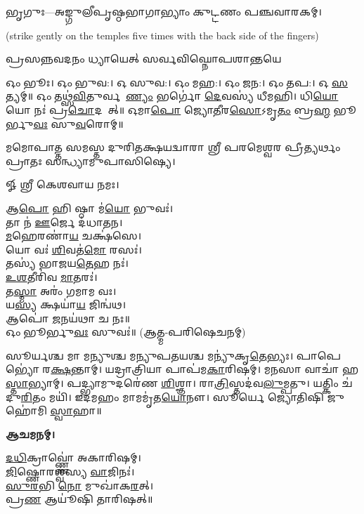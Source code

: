 
𑌭𑍃𑌗𑍁𑌃—𑌅𑌙𑍍𑌗𑍁𑌲𑍀𑌪𑍃𑌷𑍍𑌠𑌭𑌾𑌗𑌾𑌭𑍍𑌯𑌾𑌂 𑌕𑍁𑌟𑍍𑌟𑌣𑌂 𑌪𑌞𑍍𑌚𑌵𑌾𑌰𑌕𑌮𑍍।

{\scriptsize (strike gently on the temples five times with the back side of the fingers)}

{𑌪𑍍𑌰𑌸𑌨𑍍𑌨𑌵𑌦𑌨𑌂 𑌧𑍍𑌯𑌾𑌯𑍇𑌤𑍍 𑌸𑌰𑍍𑌵𑌵𑌿𑌘𑍍𑌨𑍋𑌪𑌶𑌾𑌨𑍍𑌤𑌯𑍇}


𑌓𑌂 𑌭𑍂𑌃। 𑌓𑌂 𑌭𑍁𑌵:। 𑌓 𑌸𑍁𑌵:। 𑌓𑌂 𑌮𑌹:। 𑌓𑌂 𑌜𑌨:। 𑌓𑌂 𑌤𑌪:। 𑌓 \ul{𑌸}𑌤𑍍𑌯𑌮𑍍॥
𑌓𑌂 𑌤𑌥𑍍𑌸॑\ul{𑌵𑌿}𑌤𑍁𑌰𑍍𑌵𑌰𑍇᳚\ul{𑌣𑍍𑌯𑌂} 𑌭𑌰𑍍𑌗𑍋॑ \ul{𑌦𑍇}𑌵𑌸𑍍𑌯॑ 𑌧𑍀𑌮𑌹𑌿। 𑌧𑌿\ul{𑌯𑍋} 𑌯𑍋 𑌨𑌃॑ 𑌪𑍍𑌰\ul{𑌚𑍋}𑌦𑌯𑌾᳚𑌤𑍍॥
𑌓𑌮𑌾\ul{𑌪𑍋} 𑌜𑍍𑌯𑍋\ul{𑌤𑍀}𑌰\ul{𑌸𑍋}𑌽𑌮𑍃\ul{𑌤𑌂} 𑌬𑍍𑌰\ul{𑌹𑍍𑌮} 𑌭𑍂𑌰𑍍𑌭𑍁\ul{𑌵𑌃} 𑌸𑍁\ul{𑌵}𑌰𑍋𑌮𑍍॥


𑌮𑌮𑍋𑌪𑌾𑌤𑍍𑌤 𑌸𑌮𑌸𑍍𑌤 𑌦𑍁𑌰𑌿𑌤𑌕𑍍𑌷𑌯𑌦𑍍𑌵𑌾𑌰𑌾 𑌶𑍍𑌰𑍀 𑌪𑌰𑌮𑍇𑌶𑍍𑌵𑌰 𑌪𑍍𑌰𑍀𑌤𑍍𑌯𑌰𑍍𑌥𑌂 𑌪𑍍𑌰𑌾𑌤𑌃 𑌸𑌨𑍍𑌧𑍍𑌯𑌾𑌮𑍁𑌪𑌾𑌸𑌿𑌷𑍍𑌯𑍇।


𑍐 𑌶𑍍𑌰𑍀 𑌕𑍇𑌶𑌵𑌾𑌯 𑌨𑌮𑌃।

𑌆\ul{𑌪𑍋} 𑌹𑌿 𑌷𑍍𑌠𑌾 𑌮॑\ul{𑌯𑍋} 𑌭𑍁𑌵𑌃॑।\\
𑌤𑌾 𑌨॑ \ul{𑌊}𑌰𑍍𑌜𑍇 𑌦॑𑌧𑌾𑌤𑌨।\\
\ul{𑌮}𑌹𑍇𑌰𑌣𑌾॑\ul{𑌯} 𑌚𑌕𑍍𑌷॑𑌸𑍇।\\
𑌯𑍋 𑌵𑌃॑ \ul{𑌶𑌿}𑌵𑌤॑\ul{𑌮𑍋} 𑌰𑌸𑌃॑।\\
𑌤𑌸𑍍𑌯॑ 𑌭𑌾𑌜𑌯\ul{𑌤𑍇}𑌹 𑌨𑌃॑।\\
\ul{𑌉}\ul{𑌶}𑌤𑍀𑌰𑌿॑𑌵 \ul{𑌮𑌾}𑌤𑌰𑌃॑।\\
𑌤\ul{𑌸𑍍𑌮𑌾} 𑌅𑌰𑌂॑ 𑌗𑌮𑌾𑌮 𑌵𑌃।\\
𑌯\ul{𑌸𑍍𑌯} 𑌕𑍍𑌷𑌯𑌾॑\ul{𑌯} 𑌜𑌿𑌨𑍍𑌵॑𑌥।\\
𑌆𑌪𑍋॑ \ul{𑌜}𑌨𑌯॑𑌥𑌾 𑌚 𑌨𑌃॥\\

𑌓𑌂 𑌭𑍂𑌰𑍍𑌭𑍁\ul{𑌵𑌃} 𑌸𑍁𑌵𑌃॑॥ (𑌆𑌤𑍍𑌮-𑌪𑌰𑌿𑌷𑍇𑌚𑌨𑌮𑍍)



𑌸𑍂𑌰𑍍𑌯𑌶𑍍𑌚 𑌮𑌾 𑌮𑌨𑍍𑌯𑍁𑌶𑍍𑌚 𑌮𑌨𑍍𑌯𑍁𑌪𑌤𑌯𑌶𑍍𑌚 𑌮𑌨𑍍𑌯𑍁॑𑌕𑍃\ul{𑌤𑍇}𑌭𑍍𑌯𑌃। 𑌪𑌾𑌪𑍇𑌭𑍍𑌯𑍋॑ 𑌰\ul{𑌕𑍍𑌷}𑌨𑍍𑌤𑌾𑌮𑍍। 𑌯𑌦𑍍𑌰𑌾𑌤𑍍𑌰𑌿𑌯𑌾 𑌪𑌾𑌪॑𑌮\ul{𑌕𑌾}𑌰𑌿𑌷𑌮𑍍। 𑌮𑌨𑌸𑌾 𑌵𑌾𑌚𑌾॑ 𑌹\ul{𑌸𑍍𑌤𑌾}𑌭𑍍𑌯𑌾𑌮𑍍। 𑌪𑌦𑍍𑌭𑍍𑌯𑌾𑌮𑍁𑌦𑌰𑍇॑𑌣 \ul{𑌶𑌿}𑌶𑍍𑌞𑌾। 𑌰𑌾\ul{𑌤𑍍𑌰𑌿}𑌸𑍍𑌤𑌦॑𑌵\ul{𑌲𑍁}𑌮𑍍𑌪𑌤𑍁। 𑌯𑌤𑍍𑌕𑌿𑌂 𑌚॑ 𑌦𑍁\ul{𑌰𑌿}𑌤𑌂 𑌮𑌯𑌿॑। 𑌇𑌦𑌮𑌹𑌂 𑌮𑌾𑌮𑌮𑍃॑𑌤\ul{𑌯𑍋}𑌨𑍗। 𑌸𑍂𑌰𑍍𑌯𑍇 𑌜𑍍𑌯𑍋𑌤𑌿𑌷𑌿 𑌜𑍁𑌹𑍋॑𑌮𑌿 \ul{𑌸𑍍𑌵𑌾}𑌹𑌾॥


\textbf{𑌆𑌚𑌮𑌨𑌮𑍍।}

\ul{𑌦}\ul{𑌧𑌿}𑌕𑍍𑌰𑌾𑌵𑍍𑌣𑍍𑌣𑍋॑ 𑌅𑌕𑌾𑌰𑌿𑌷𑌮𑍍।\\
 \ul{𑌜𑌿}𑌷𑍍𑌣𑍋𑌰𑌶𑍍𑌵॑𑌸𑍍𑌯 \ul{𑌵𑌾}𑌜𑌿𑌨𑌃॑।\\
\ul{𑌸𑍁}\ul{𑌰}𑌭𑌿 \ul{𑌨𑍋} 𑌮𑍁𑌖𑌾॑𑌕\ul{𑌰}𑌤𑍍।\\
𑌪𑍍𑌰\ul{𑌣} 𑌆𑌯𑍂॑𑌷𑌿 𑌤𑌾𑌰𑌿𑌷𑌤𑍍॥\\



